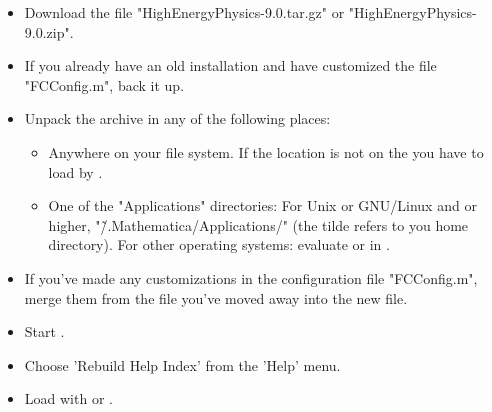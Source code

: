 \begin{itemize}

\item{Download the file "HighEnergyPhysics-9.0.tar.gz" or
"HighEnergyPhysics-9.0.zip".}

\item{If you already have an old installation and have customized the file "FCConfig.m", back it up.}

\item{Unpack the archive in any of the following places:

\begin{itemize}

\item{Anywhere on your file system. If the location is not on the \mma {} you
have to load \fc by .}

\item{One of the \mma "Applications" directories: For {\sc Unix} or {\sc GNU/Linux} and
 or higher, "\~/.Mathematica/Applications/" (the tilde refers to you home directory).
For other operating systems: evaluate  or  in \mma.}
\end{itemize}
}

\item{If you've made any customizations in the configuration file "FCConfig.m", merge them from the file you've moved away into the new file.}

\item{Start \mma.}

\item{Choose 'Rebuild Help Index' from the 'Help' menu.}

\item{Load \fc with  or .}

\end{itemize}



